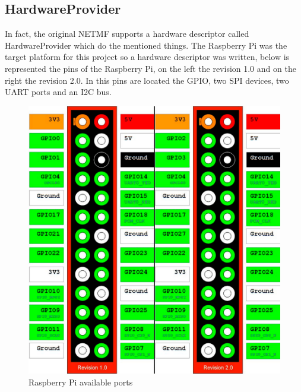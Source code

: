 \subsection{HardwareProvider}\label{SS:HardwareProvider}
In fact, the original NETMF supports a hardware descriptor called HardwareProvider which do the mentioned things. The Raspberry Pi was the target platform for this project so a hardware descriptor was written, below is represented the pins of the Raspberry Pi, on the left the revision 1.0 and on the right the revision 2.0. In this pins are located the GPIO, two SPI devices, two UART ports and an \gls{I2C} bus.

\begin{figure}[H]\begin{center}
 \centering
  \captionsetup{justification=centering}
  \includegraphics[scale=0.30]{pictures/iosharp/mapping-raspberrypi}
  \caption{Raspberry Pi available ports\label{fig:mapping-rpi}}
\end{center}\end{figure}

